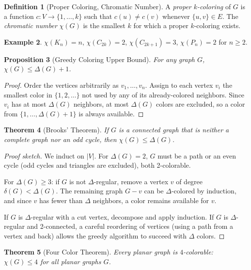 \documentclass[12pt,a4paper]{amsart}
\newtheorem{theorem}{Theorem}[section]
\newtheorem{proposition}[theorem]{Proposition}
\theoremstyle{definition}
\newtheorem{definition}[theorem]{Definition}
\newtheorem{example}[theorem]{Example}
\theoremstyle{remark}
\newcommand{\chr}{\chi}
\begin{document}
\begin{definition}[Proper Coloring, Chromatic Number]
A \emph{proper $k$-coloring} of $G$ is a function $c: V \to \{1, \ldots, k\}$
such that $c(u) \ne c(v)$ whenever $\{u,v\} \in E$. The \emph{chromatic
number} $\chr(G)$ is the smallest $k$ for which a proper $k$-coloring exists.
\end{definition}

\begin{example}
$\chr(K_n) = n$, $\chr(C_{2k}) = 2$, $\chr(C_{2k+1}) = 3$, $\chr(P_n) = 2$
for $n \ge 2$.
\end{example}

\begin{proposition}[Greedy Coloring Upper Bound]
\label{prop:greedy}
For any graph $G$, $\chr(G) \le \Delta(G) + 1$.
\end{proposition}

\begin{proof}
Order the vertices arbitrarily as $v_1, \ldots, v_n$. Assign to each vertex
$v_i$ the smallest color in $\{1, 2, \ldots\}$ not used by any of its
already-colored neighbors. Since $v_i$ has at most $\Delta(G)$ neighbors, at
most $\Delta(G)$ colors are excluded, so a color from $\{1, \ldots, \Delta(G)+1\}$
is always available.
\end{proof}

\begin{theorem}[Brooks' Theorem]
\label{thm:brooks}
If $G$ is a connected graph that is neither a complete graph nor an odd cycle,
then $\chr(G) \le \Delta(G)$.
\end{theorem}

\begin{proof}[Proof sketch]
We induct on $|V|$. For $\Delta(G) = 2$, $G$ must be a path or an even cycle
(odd cycles and triangles are excluded), both 2-colorable.

For $\Delta(G) \ge 3$: if $G$ is not $\Delta$-regular, remove a vertex $v$
of degree $\delta(G) < \Delta(G)$. The remaining graph $G - v$ can be
$\Delta$-colored by induction, and since $v$ has fewer than $\Delta$ neighbors,
a color remains available for $v$.

If $G$ is $\Delta$-regular with a cut vertex, decompose and apply induction.
If $G$ is $\Delta$-regular and 2-connected, a careful reordering of vertices
(using a path from a vertex and back) allows the greedy algorithm to succeed
with $\Delta$ colors.
\end{proof}

\begin{theorem}[Four Color Theorem]
\label{thm:4color}
Every planar graph is $4$-colorable: $\chr(G) \le 4$ for all planar graphs $G$.
\end{theorem}
\end{document}
